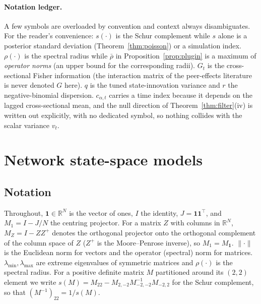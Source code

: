 \documentclass[12pt]{article}
\theoremstyle{plain}
\theoremstyle{definition}
\theoremstyle{remark}
\newcommand{\R}{\mathbb{R}}
\newcommand{\one}{\mathbf{1}}
\newcommand{\T}{^{\top}}
\begin{document}
\paragraph{Notation ledger.} A few symbols are overloaded by convention and context always disambiguates. For the reader's convenience: $s(\cdot)$ is the Schur complement while $s$ alone is a posterior standard deviation (Theorem~\ref{thm:poisson}) or a simulation index. $\rho(\cdot)$ is the spectral radius while $\bar\rho$ in Proposition~\ref{prop:plugin} is a maximum of \emph{operator norms} (an upper bound for the corresponding radii). $G_t$ is the cross-sectional Fisher information (the interaction matrix of the peer-effects literature is never denoted $G$ here). $q$ is the tuned state-innovation variance and $r$ the negative-binomial dispersion. $c_{\alpha,t}$ carries a time index because it depends on the lagged cross-sectional mean, and the null direction of Theorem~\ref{thm:filter}(iv) is written out explicitly, with no dedicated symbol, so nothing collides with the scalar variance $v_t$.

\section{Network state-space models}\label{sec:model}

\subsection{Notation}
Throughout, $\one\in\R^N$ is the vector of ones, $I$ the identity, $J=\one\one\T$, and $M_1=I-J/N$ the centring projector. For a matrix $Z$ with columns in $\R^N$, $M_Z=I-ZZ^{+}$ denotes the orthogonal projector onto the orthogonal complement of the column space of $Z$ ($Z^+$ is the Moore--Penrose inverse), so $M_1=M_{\one}$. $\|\cdot\|$ is the Euclidean norm for vectors and the operator (spectral) norm for matrices. $\lambda_{\min},\lambda_{\max}$ are extreme eigenvalues of symmetric matrices and $\rho(\cdot)$ is the spectral radius. For a positive definite matrix $M$ partitioned around its $(2,2)$ element we write $s(M)=M_{22}-M_{2,-2}M_{-2,-2}^{-1}M_{-2,2}$ for the Schur complement, so that $(M^{-1})_{22}=1/s(M)$.
\end{document}
